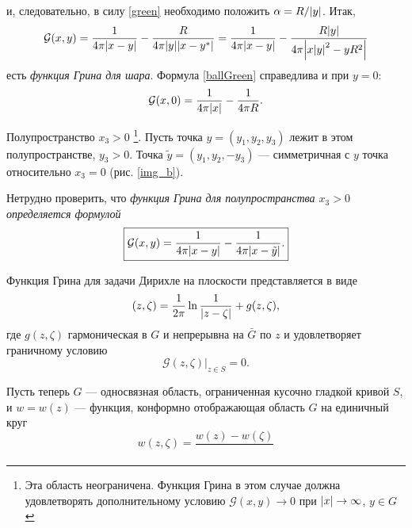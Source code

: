 	и, следовательно, в силу \eqref{green} необходимо положить $\alpha = R/\abs{y}$. Итак,
	\begin{equation} \label{ballGreen}
		\mathcal{G}(x, y) = \frac{1}{4 \pi \abs{x - y}} - \frac{R}{4 \pi \abs{y} \abs{x - y^{\ast}}} = \frac{1}{4 \pi \abs{x - y}} - \frac{R \abs{y}}{4 \pi \abs{x \abs{y}^2 - y R^2}}
	\end{equation}
	есть \textit{функция Грина для шара}. Формула \eqref{ballGreen} справедлива и при $y = 0$:
	\begin{equation*}
		\mathcal{G}(x, 0) = \frac{1}{4 \pi \abs{x}} - \frac{1}{4 \pi R}.
	\end{equation*}

	Полупространство $x_3 > 0$ \footnote{Эта область неограничена. Функция Грина в этом случае должна удовлетворять дополнительному условию $\mathcal{G}(x, y) \to 0$ при $\abs{x} \to \infty$, $y \in G$}. Пусть точка $y = (y_1, y_2, y_3)$ лежит в этом полупространстве, $y_3 > 0$. Точка $\tilde{y} = (y_1, y_2, -y_3)$ --- симметричная с $y$ точка относительно $x_3 = 0$ (рис. \ref{img_b}).
	
	Нетрудно проверить, что \textit{функция Грина для полупространства $x_3 > 0$ определяется формулой }
	\begin{equation}
		\boxed{\mathcal{G}(x, y) = \frac{1}{4 \pi \abs{x - y}} - \frac{1}{4 \pi \abs{x - \tilde{y}}}.}
	\end{equation}
	
	Функция Грина для задачи Дирихле на плоскости  представляется в виде
	\begin{equation}
		\mathcal(z, \zeta) = \frac{1}{2 \pi} \ln{\frac{1}{\abs{z - \zeta}}} + g(z, \zeta),
	\end{equation}
	где $g(z, \zeta)$ гармоническая в $G$ и непрерывна на $\bar{G}$ по $z$ и удовлетворяет граничному условию 
	\begin{equation}
		\mathcal{G}(z, \zeta)|_{z \in S} = 0.
	\end{equation}
	
	Пусть теперь $G$ --- односвязная область, ограниченная кусочно гладкой кривой $S$, и $w = w(z)$ --- функция, конформно отображающая область $G$ на единичный круг
	\begin{equation}
		w(z, \zeta) = \frac{w(z) - w(\zeta)}{}
	\end{equation}
